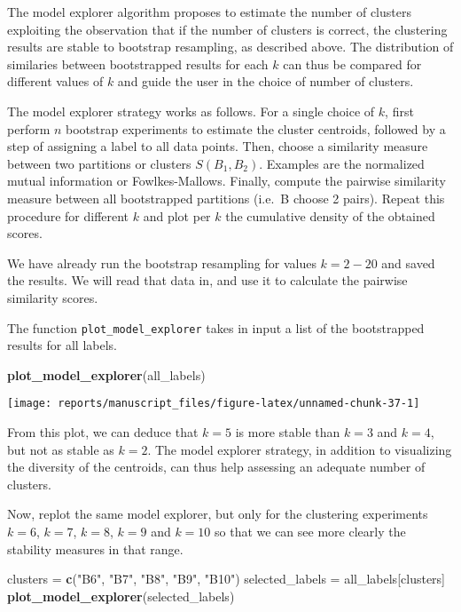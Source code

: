 \documentclass[9pt,a4paper,]{extarticle}
\newenvironment{Shaded}{\begin{snugshade}}{\end{snugshade}}
\newcommand{\KeywordTok}[1]{\textcolor[rgb]{0.13,0.29,0.53}{\textbf{#1}}}
\newcommand{\NormalTok}[1]{#1}
\newcommand{\StringTok}[1]{\textcolor[rgb]{0.31,0.60,0.02}{#1}}
\begin{document}
The model explorer algorithm \citep{ben-hur:stability} proposes to estimate the
number of clusters exploiting the observation that if the number of clusters
is correct, the clustering results are stable to bootstrap resampling, as
described above. The distribution of similaries between bootstrapped results
for each \(k\) can thus be compared for different values of \(k\) and guide the
user in the choice of number of clusters.

The model explorer strategy works as follows. For a single choice of \(k\),
first perform \(n\) bootstrap experiments to estimate the cluster centroids,
followed by a step of assigning a label to all data points. Then, choose a
similarity measure between two partitions or clusters \(S(B_1, B_2)\). Examples
are the normalized mutual information or Fowlkes-Mallows. Finally, compute the
pairwise similarity measure between all bootstrapped partitions (i.e.~B choose
2 pairs). Repeat this procedure for different \(k\) and plot per \(k\) the
cumulative density of the obtained scores.

We have already run the bootstrap resampling for values \(k=2-20\) and saved the
results. We will read that data in, and use it to calculate the pairwise
similarity scores.

The function \texttt{plot\_model\_explorer} takes in input a list of the bootstrapped
results for all labels.

\begin{Shaded}
\begin{Highlighting}[]
\KeywordTok{plot_model_explorer}\NormalTok{(all_labels)}
\end{Highlighting}
\end{Shaded}

\begin{center}\texttt{[image: reports/manuscript\_files/figure-latex/unnamed-chunk-37-1]} \end{center}

From this plot, we can deduce that \(k=5\) is more stable than \(k=3\) and \(k=4\),
but not as stable as \(k=2\). The model explorer strategy, in addition to
visualizing the diversity of the centroids, can thus help assessing an
adequate number of clusters.

Now, replot the same model explorer, but only for the clustering experiments
\(k=6\), \(k=7\), \(k=8\), \(k=9\) and \(k=10\) so that we can see more clearly the stability
measures in that range.

\begin{Shaded}
\begin{Highlighting}[]
\NormalTok{clusters =}\StringTok{ }\KeywordTok{c}\NormalTok{(}\StringTok{"B6"}\NormalTok{, }\StringTok{"B7"}\NormalTok{, }\StringTok{"B8"}\NormalTok{, }\StringTok{"B9"}\NormalTok{, }\StringTok{"B10"}\NormalTok{)}
\NormalTok{selected_labels =}\StringTok{ }\NormalTok{all_labels[clusters]}
\KeywordTok{plot_model_explorer}\NormalTok{(selected_labels)}
\end{Highlighting}
\end{Shaded}
\end{document}
